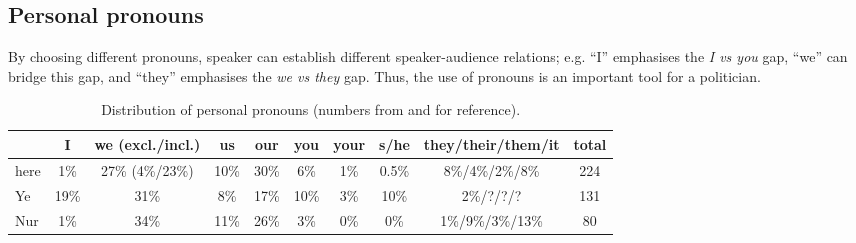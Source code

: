 \documentclass[11pt]{article}
\begin{document}
{	%
	\subsection{Personal pronouns}{
		By choosing different pronouns, speaker can establish different speaker-audience relations; e.g. ``I'' emphasises the \textit{I vs you} gap, ``we'' can bridge this gap, and ``they'' emphasises the \textit{we vs they} gap. Thus, the use of pronouns is an important tool for a politician.

		\begin{table}[h!tb]
	      \centering
	        \begin{tabular}{l|ccccccccc}
	                & I    & we (excl./incl.) & us   & our  & you  & your & s/he  & they/their/them/it & total \\
	          \hline
	          \hline
	          here  & 1\%  & 27\% (4\%/23\%)  & 10\% & 30\% & 6\%  & 1\%  & 0.5\% & 8\%/4\%/2\%/8\%    & 224 \\
	          \hline
	          Ye    & 19\% & 31\%             & 8\%  & 17\% & 10\% & 3\%  & 10\%  & 2\%/?/?/?          & 131 \\
	          Nur   & 1\%  & 34\%             & 11\% & 26\% & 3\%  & 0\%  & 0\%   & 1\%/9\%/3\%/13\%   & 80 \\
	        \end{tabular}
	      \caption{Distribution of personal pronouns (numbers from \citeauthor{Ye} and \citeauthor{Nur} for reference).}
	      \label{tab:pronouns}
	    \end{table}

}}
\end{document}
